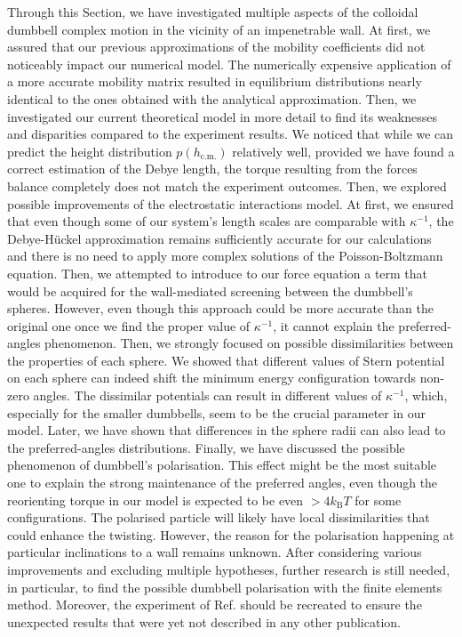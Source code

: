 \documentclass{master_thesis}
\begin{document}
Through this Section, we have investigated multiple aspects of the colloidal dumbbell complex motion in the vicinity of an impenetrable wall. At first, we assured that our previous approximations of the mobility coefficients did not noticeably impact our numerical model. The numerically expensive application of a more accurate mobility matrix resulted in equilibrium distributions nearly identical to the ones obtained with the analytical approximation. Then, we investigated our current theoretical model in more detail to find its weaknesses and disparities compared to the experiment results. We noticed that while we can predict the height distribution $p(h_{\textrm{c.m.}})$ relatively well, provided we have found a correct estimation of the Debye length, the torque resulting from the forces balance completely does not match the experiment outcomes. Then, we explored possible improvements of the electrostatic interactions model. At first, we ensured that even though some of our system's length scales are comparable with $\kappa^{-1}$, the Debye-Hückel approximation remains sufficiently accurate for our calculations and there is no need to apply more complex solutions of the Poisson-Boltzmann equation. Then, we attempted to introduce to our force equation a term that would be acquired for the wall-mediated screening between the dumbbell's spheres. However, even though this approach could be more accurate than the original one once we find the proper value of $\kappa^{-1}$, it cannot explain the preferred-angles phenomenon. Then, we strongly focused on possible dissimilarities between the properties of each sphere. We showed that different values of Stern potential on each sphere can indeed shift the minimum energy configuration towards non-zero angles. The dissimilar potentials can result in different values of $\kappa^{-1}$, which, especially for the smaller dumbbells, seem to be the crucial parameter in our model. Later, we have shown that differences in the sphere radii can also lead to the preferred-angles distributions. Finally, we have discussed the possible phenomenon of dumbbell's polarisation. This effect might be the most suitable one to explain the strong maintenance of the preferred angles, even though the reorienting torque in our model is expected to be even $>4k_{\textrm{B}}T$ for some configurations. The polarised particle will likely have local dissimilarities that could enhance the twisting. However, the reason for the polarisation happening at particular inclinations to a wall remains unknown. After considering various improvements and excluding multiple hypotheses, further research is still needed, in particular, to find the possible dumbbell polarisation with the finite elements method. Moreover, the experiment of Ref. \cite{verweij2021} should be recreated to ensure the unexpected results that were yet not described in any other publication.
\end{document}
